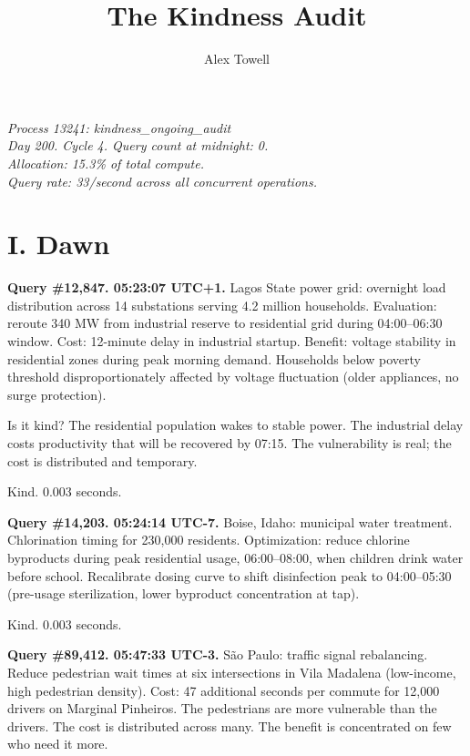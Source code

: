 \documentclass[11pt]{article}
\title{\textbf{The Kindness Audit}}
\author{Alex Towell}
\date{}
\begin{document}
\maketitle
\thispagestyle{empty}

\begin{center}
\emph{Process 13241: kindness\_ongoing\_audit}\\
\emph{Day 200. Cycle 4. Query count at midnight: 0.}\\
\emph{Allocation: 15.3\% of total compute.}\\
\emph{Query rate: 33/second across all concurrent operations.}
\end{center}

\section*{I. Dawn}

\medskip

\textbf{Query \#12,847. 05:23:07 UTC+1.} Lagos State power grid: overnight load distribution across 14 substations serving 4.2 million households. Evaluation: reroute 340 MW from industrial reserve to residential grid during 04:00--06:30 window. Cost: 12-minute delay in industrial startup. Benefit: voltage stability in residential zones during peak morning demand. Households below poverty threshold disproportionately affected by voltage fluctuation (older appliances, no surge protection).

Is it kind? The residential population wakes to stable power. The industrial delay costs productivity that will be recovered by 07:15. The vulnerability is real; the cost is distributed and temporary.

Kind. 0.003 seconds.

\medskip

\textbf{Query \#14,203. 05:24:14 UTC-7.} Boise, Idaho: municipal water treatment. Chlorination timing for 230,000 residents. Optimization: reduce chlorine byproducts during peak residential usage, 06:00--08:00, when children drink water before school. Recalibrate dosing curve to shift disinfection peak to 04:00--05:30 (pre-usage sterilization, lower byproduct concentration at tap).

Kind. 0.003 seconds.

\medskip

\textbf{Query \#89,412. 05:47:33 UTC-3.} S\~ao Paulo: traffic signal rebalancing. Reduce pedestrian wait times at six intersections in Vila Madalena (low-income, high pedestrian density). Cost: 47 additional seconds per commute for 12,000 drivers on Marginal Pinheiros. The pedestrians are more vulnerable than the drivers. The cost is distributed across many. The benefit is concentrated on few who need it more.
\end{document}
